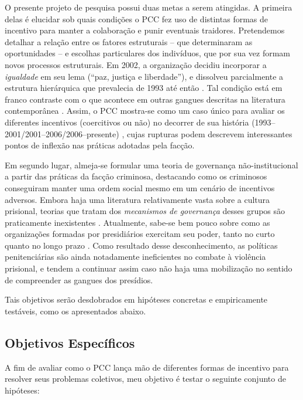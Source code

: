 \documentclass[a4paper,11pt]{article}
\begin{document}
O presente projeto de pesquisa possui duas metas a serem atingidas. A primeira delas é elucidar sob quais condições o PCC fez uso de distintas formas de incentivo para manter a colaboração e punir eventuais traidores. Pretendemos detalhar a relação entre os fatores estruturais -- que determinaram as oportunidades -- e escolhas particulares dos indivíduos, que por sua vez formam novos processos estruturais. Em 2002, a organização decidiu incorporar a \textit{igualdade} em seu lema (``paz, justiça e liberdade''), e dissolveu parcialmente a estrutura hierárquica que prevalecia de 1993 até então \citep{biondi2010junto}. Tal condição está em franco contraste com o que acontece em outras gangues descritas na literatura contemporânea \citep{leeson2010criminal}. Assim, o PCC mostra-se como um caso único para avaliar os diferentes incentivos (coercitivos ou não) no decorrer de sua história (1993--2001/2001--2006/2006--presente) \citep[165-181]{dias2011pulverizaccao}, cujas rupturas podem descrevem interessantes pontos de inflexão nas práticas adotadas pela facção.

Em segundo lugar, almeja-se formular uma teoria de governança não-institucional a partir das práticas da facção criminosa, destacando como os criminosos conseguiram manter uma ordem social mesmo em um cenário de incentivos adversos. Embora haja uma literatura relativamente vasta sobre a cultura prisional, teorias que tratam dos \textit{mecanismos de governança} desses grupos são praticamente inexistentes \citep{skarbek2011governance, skarbek2014social}. Atualmente, sabe-se bem pouco sobre como as organizações formadas por presidiários exercitam seu poder, tanto no curto quanto no longo prazo \citep{roberts2014prison}. Como resultado desse desconhecimento, as políticas penitenciárias são ainda notadamente ineficientes no combate à violência prisional, e tendem a continuar assim caso não haja uma mobilização no sentido de compreender as gangues dos presídios.

Tais objetivos serão desdobrados em hipóteses concretas e empiricamente testáveis, como os apresentados abaixo.

\subsection{Objetivos Específicos}

A fim de avaliar como o PCC lança mão de diferentes formas de incentivo para resolver seus problemas coletivos, meu objetivo é testar o seguinte conjunto de hipóteses:\\
\end{document}
